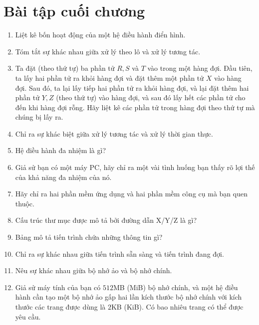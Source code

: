 \section{Bài tập cuối chương}
  

\begin{multicols}{2}
  \begin{enumerate}
  \item Liệt kê bốn hoạt động của một hệ điều hành điển hình.

  \item Tóm tắt sự khác nhau giữa xử lý theo lô và xử lý tương tác.

  \item Ta đặt (theo thứ tự) ba phần tử $R, S$ và $T$ vào trong một
    hàng đợi. Đầu tiên, ta lấy hai phần tử ra khỏi hàng đợi và đặt
    thêm một phần tử $X$ vào hàng đợi. Sau đó, ta lại lấy tiếp hai
    phần tử ra khỏi hàng đợi, và lại đặt thêm hai phần tử $Y, Z$ (theo
    thứ tự) vào hàng đợi, và sau đó lấy hết các phần tử cho đến khi
    hàng đợi rỗng. Hãy liệt kê các phần tử trong hàng đợi theo thứ tự
    mà chúng bị lấy ra.

  \item Chỉ ra sự khác biệt giữa xử lý tương tác và xử lý thời gian
    thực.

  \item Hệ điều hành đa nhiệm là gì?

  \item Giả sử bạn có một máy PC, hãy chỉ ra một vài tình huống bạn
    thấy rõ lợi thế của khả năng đa nhiệm của nó.

  \item Hãy chỉ ra hai phần mềm ứng dụng và hai phần mềm công cụ mà
    bạn quen thuộc.

  \item Cấu trúc thư mục được mô tả bởi đường dẫn X/Y/Z là gì?

  \item Bảng mô tả tiến trình chứa những thông tin gì?

  \item Chỉ ra sự khác nhau giữa tiến trình sẵn sàng và tiến trình
    đang đợi.

  \item Nêu sự khác nhau giữa bộ nhớ ảo và bộ nhớ chính.

  \item Giả sử máy tính của bạn có $512$MB (MiB) bộ nhớ chính, và một
    hệ điều hành cần tạo một bộ nhớ ảo gấp hai lần kích thước bộ nhớ
    chính với kích thước các trang được dùng là $2$KB (KiB). Có bao
    nhiêu trang có thể được yêu cầu.


\end{enumerate}
\end{multicols}
